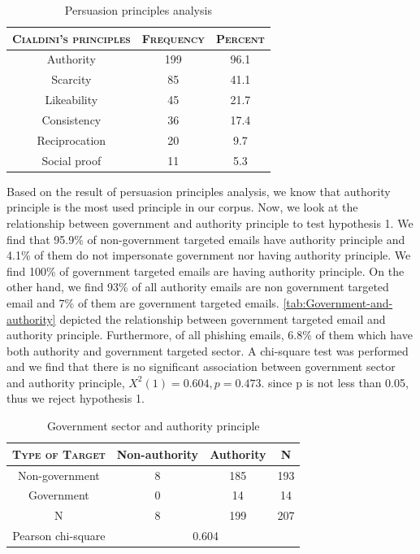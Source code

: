 \begin{table}[h]
\centering{}%
\begin{tabular}{ccc}
\toprule 
\textsc{\small{}Cialdini's principles} & \textsc{\small{}Frequency} & \textsc{\small{}Percent}\tabularnewline
\midrule
\midrule 
{\small{}Authority} & 199 & 96.1\tabularnewline
\midrule 
{\small{}Scarcity} & 85 & 41.1\tabularnewline
\midrule 
{\small{}Likeability} & 45 & 21.7\tabularnewline
\midrule 
Consistency & 36 & 17.4\tabularnewline
\midrule 
Reciprocation & 20 & 9.7\tabularnewline
\midrule 
Social proof & 11 & 5.3\tabularnewline
\bottomrule
\end{tabular}\protect\caption{\label{tab:Persuasion-principle-analysis}Persuasion principles analysis}
\end{table}


Based on the result of persuasion principles analysis, we know that
authority principle is the most used principle in our corpus. Now,
we look at the relationship between government and authority principle
to test hypothesis 1. We find that 95.9\% of non-government targeted
emails have authority principle and 4.1\% of them do not impersonate
government nor having authority principle. We find 100\% of government
targeted emails are having authority principle. On the other hand,
we find 93\% of all authority emails are non government targeted email
and 7\% of them are government targeted emails. \autoref{tab:Government-and-authority}
depicted the relationship between government targeted email and authority
principle. Furthermore, of all phishing emails, 6.8\% of them which
have both authority and government targeted sector. A chi-square test
was performed and we find that there is no significant association
between government sector and authority principle, $X^{2}(1)=0.604,p=0.473$.
since p is not less than 0.05, thus we reject hypothesis 1.

\begin{minipage}[t]{1\columnwidth}%
\begin{longtable}{cccc}
\caption{\label{tab:Government-and-authority}Government sector and authority
principle}
\tabularnewline
\toprule 
\textsc{\footnotesize{}Type of Target} & {\footnotesize{}Non-authority} & {\footnotesize{}Authority} & \multirow{1}{*}{{\footnotesize{}N}}\tabularnewline
\midrule 
\multirow{1}{*}{{\footnotesize{}Non-government}} & {\footnotesize{}8} & {\footnotesize{}185} & \multirow{1}{*}{{\footnotesize{}193}}\tabularnewline
\midrule 
\multirow{1}{*}{{\footnotesize{}Government}} & {\footnotesize{}0} & {\footnotesize{}14} & \multirow{1}{*}{{\footnotesize{}14}}\tabularnewline
\midrule
\midrule 
{\footnotesize{}N} & {\footnotesize{}8} & {\footnotesize{}199} & {\footnotesize{}207}\tabularnewline
\midrule
\midrule 
{\footnotesize{}Pearson chi-square} & \multicolumn{3}{c}{{\footnotesize{}0.604}}\tabularnewline
\midrule
\end{longtable}%
\end{minipage}

